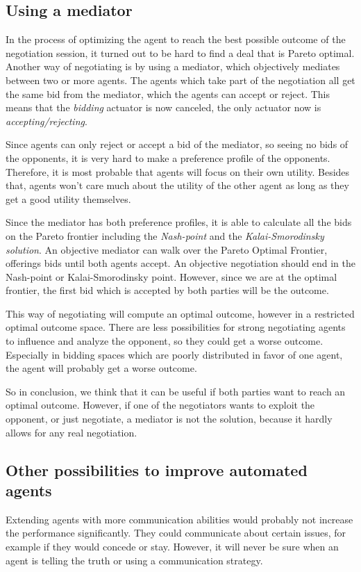 \subsection{Using a mediator}
In the process of optimizing the agent to reach the best possible outcome of the negotiation session, it turned out to be hard to find a deal that is Pareto optimal. Another way of negotiating is by using a mediator, which objectively mediates between two or more agents. The agents which take part of the negotiation all get the same bid from the mediator, which the agents can accept or reject. This means that the \textit{bidding} actuator is now canceled, the only actuator now is \textit{accepting/rejecting}.

Since agents can only reject or accept a bid of the mediator, so seeing no bids of the opponents, it is very hard to make a preference profile of the opponents. Therefore, it is most probable that agents will focus on their own utility. Besides that, agents won't care much about the utility of the other agent as long as they get a good utility themselves. 

Since the mediator has both preference profiles, it is able to calculate all the bids on the Pareto frontier including the \emph{Nash-point} and the \emph{Kalai-Smorodinsky solution}. An objective mediator can walk over the Pareto Optimal Frontier, offerings bids until both agents accept. An objective negotiation should end in the Nash-point or Kalai-Smorodinsky point. However, since we are at the optimal frontier, the first bid which is accepted by both parties will be the outcome.

This way of negotiating will compute an optimal outcome, however in a restricted optimal outcome space. There are less possibilities for strong negotiating agents to influence and analyze the opponent, so they could get a worse outcome. Especially in bidding spaces which are poorly distributed in favor of one agent, the agent will probably get a worse outcome.

So in conclusion, we think that it can be useful if both parties want to reach an optimal outcome.
However, if one of the negotiators wants to exploit the opponent, or just negotiate, a mediator
is not the solution, because it hardly allows for any real negotiation.

\subsection{Other possibilities to improve automated agents}
Extending agents with more communication abilities would probably not increase the performance significantly. They could
communicate about certain issues, for example if they would concede or stay. However, it will never be sure when an agent is telling the truth or using a communication strategy. 

